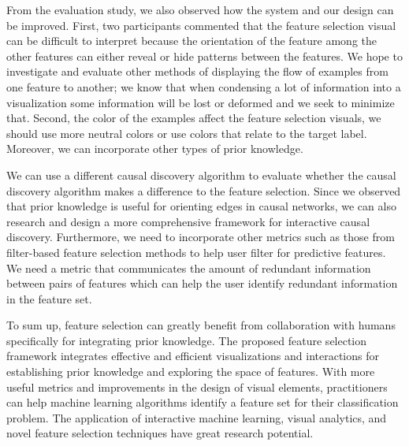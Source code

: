 From the evaluation study, we also observed how the system and our design can be improved. First, two participants commented that the feature selection visual can be difficult to interpret because the orientation of the feature among the other features can either reveal or hide patterns between the features. We hope to investigate and evaluate other methods of displaying the flow of examples from one feature to another; we know that when condensing a lot of information into a visualization some information will be lost or deformed and we seek to minimize that. Second, the color of the examples affect the feature selection visuals, we should use more neutral colors or use colors that relate to the target label. Moreover, we can incorporate other types of prior knowledge.

We can use a different causal discovery algorithm to evaluate whether the causal discovery algorithm makes a difference to the feature selection. Since we observed that prior knowledge is useful for orienting edges in causal networks, we can also research and design a more comprehensive framework for interactive causal discovery. Furthermore, we need to incorporate other metrics such as those from filter-based feature selection methods to help user filter for predictive features. We need a metric that communicates the amount of redundant information between pairs of features which can help the user identify redundant information in the feature set.

To sum up, feature selection can greatly benefit from collaboration with humans specifically for integrating prior knowledge.  The proposed feature selection framework integrates effective and efficient visualizations and interactions for establishing prior knowledge and exploring the space of features. With more useful metrics and improvements in the design of visual elements, practitioners can help machine learning algorithms identify a feature set for their classification problem.  The application of interactive machine learning, visual analytics, and novel feature selection techniques have great research potential.

